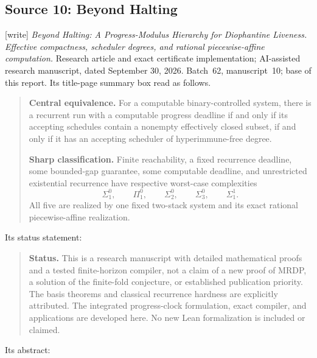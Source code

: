 \documentclass[11pt,letterpaper]{article}
\theoremstyle{definition}
\theoremstyle{remark}
\newcommand{\sig}[1]{\Sigma^{0}_{#1}}
\newcommand{\ppi}[1]{\Pi^{0}_{#1}}
\newcommand{\an}{\Sigma^{1}_{1}}
\newcommand{\1}{\mathbf 1}
\newcommand{\wtag}{\textup{[write]}}%
\begin{document}
\subsection{Source 10: Beyond Halting}\label{lbh:sec:ms10}
\wtag{} \emph{Beyond Halting: A Progress-Modulus Hierarchy for Diophantine Liveness. Effective
compactness, scheduler degrees, and rational piecewise-affine computation.} Research article and
exact certificate implementation; AI-assisted research manuscript, dated September 30, 2026.
Batch~62, manuscript~10; base of this report. Its title-page summary box read as follows.
\begin{quote}\small
\textbf{Central equivalence.} For a computable binary-controlled system,
there is a recurrent run with a computable progress deadline if and only if
its accepting schedules contain a nonempty effectively closed subset,
if and only if it has an accepting scheduler of hyperimmune-free degree.

\textbf{Sharp classification.} Finite reachability, a fixed recurrence
deadline, some bounded-gap guarantee, some computable deadline, and
unrestricted existential recurrence have respective worst-case complexities
\[
 \sig1,\qquad \ppi1,\qquad \sig2,\qquad \sig3,\qquad \an.
\]
All five are realized by one fixed two-stack system and its exact rational
piecewise-affine realization.
\end{quote}
Its status statement:
\begin{quote}\small
\textbf{Status.} This is a research manuscript with detailed mathematical proofs
and a tested finite-horizon compiler, not a claim of a new proof of MRDP,
a solution of the finite-fold conjecture, or established publication priority.
The basis theorems and classical recurrence hardness are explicitly attributed.
The integrated progress-clock formulation, exact compiler, and applications
are developed here. No new Lean formalization is included or claimed.
\end{quote}
Its abstract:
\end{document}
